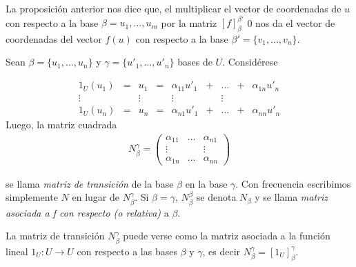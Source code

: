     	La proposición anterior nos dice que, el multiplicar el vector de coordenadas de $ u $ con respecto a la base $ \beta = {u_{1} , \ldots , u_{m} } $ por la matriz $ [f]_{\beta}^{\beta '} $ 0
    	nos da el vector de	coordenadas del vector $ f (u) $ con respecto a la base $ \beta ' = \{v_{1} , \ldots , v_{n} \} $.
    	\begin{defi}
    		 Sean $\beta =\{u_{1}, \ldots , u_{n}\} $ y $\gamma= \{u'_{1} , \ldots , u'_{n}\}$ bases de $U$.
Considérese
    	\end{defi}
    	\[\begin{array}{ccccccccc} 
    			1_{U}(u_{1}) &=& u_{1} &=& \alpha_{11}u'_{1} &+& \ldots& +& \alpha_{1n}u'_{n}  \\ \vdots & & \vdots & & \vdots & & \vdots && \\ 1_{U}(u_{n}) &=& u_{n} &=& \alpha_{n1}u'_{1} &+& \ldots& +& \alpha_{nn}u'_{n} 
    	\end{array}\]
    	Luego, la matriz cuadrada
    			\[\begin{array}{c}
    					N_{\beta}^{\gamma}= \left( \begin{array}{ccc}
    					\alpha_{11} & \ldots & \alpha_{n1} \\
    					\vdots &   &  \vdots \\
    					\alpha_{1n} & \ldots & \alpha_{nn}
    					\end{array} \right) 
    			\end{array}\]
    			
    			se llama \textit{matriz de transición} de la base $ \beta $ en la base $ \gamma $. Con frecuencia escribimos simplemente $ N $ en lugar de $ N_{\beta}^{\gamma} $. Si $ \beta = \gamma $, $ N_{\beta}^{\beta} $ se denota $ N_{\beta} $ y se llama \textit{matriz asociada a f con respecto (o relativa)} a $\beta$.
    			
    			La matriz de transición $ N_{\beta}^{\gamma} $ puede verse como la matriz asociada a la función	lineal $ 1_{U}:U \rightarrow U $ con respecto a las bases $\beta$ y $\gamma$, es decir $ N_{\beta}^{\gamma} = [1_{U}]_{\beta}^\gamma $.
    			
